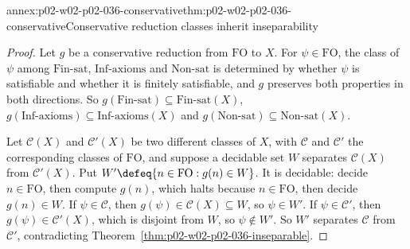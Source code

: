 \begin{annexitem}{annex:p02-w02-p02-036-conservative}{thm:p02-w02-p02-036-conservative}{Conservative reduction classes inherit inseparability}
\begin{proof}
Let \(g\) be a conservative reduction from \(\mathrm{FO}\) to \(X\).  For
\(\psi\in\mathrm{FO}\), the class of \(\psi\) among \(\mathrm{Fin\text{-}sat}\),
\(\mathrm{Inf\text{-}axioms}\) and \(\mathrm{Non\text{-}sat}\) is determined by
whether \(\psi\) is satisfiable and whether it is finitely satisfiable, and
\(g\) preserves both properties in both directions.  So
\(g(\mathrm{Fin\text{-}sat})\subseteq\mathrm{Fin\text{-}sat}(X)\),
\(g(\mathrm{Inf\text{-}axioms})\subseteq\mathrm{Inf\text{-}axioms}(X)\) and
\(g(\mathrm{Non\text{-}sat})\subseteq\mathrm{Non\text{-}sat}(X)\).

Let \(\mathcal C(X)\) and \(\mathcal C'(X)\) be two different classes of \(X\),
with \(\mathcal C\) and \(\mathcal C'\) the corresponding classes of
\(\mathrm{FO}\), and suppose a decidable set \(W\) separates \(\mathcal C(X)\)
from \(\mathcal C'(X)\).  Put
\(W'\defeq\{n\in\mathrm{FO}:g(n)\in W\}\).  It is decidable: decide
\(n\in\mathrm{FO}\), then compute \(g(n)\), which halts because
\(n\in\mathrm{FO}\), then decide \(g(n)\in W\).  If \(\psi\in\mathcal C\), then
\(g(\psi)\in\mathcal C(X)\subseteq W\), so \(\psi\in W'\).  If
\(\psi\in\mathcal C'\), then \(g(\psi)\in\mathcal C'(X)\), which is disjoint
from \(W\), so \(\psi\notin W'\).  So \(W'\) separates \(\mathcal C\) from
\(\mathcal C'\), contradicting Theorem~\ref{thm:p02-w02-p02-036-inseparable}.
\end{proof}
\end{annexitem}

